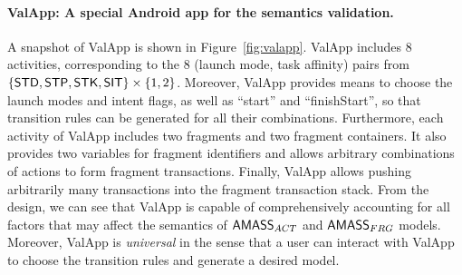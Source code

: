 \paragraph*{ValApp: A special Android app for the semantics validation.} A snapshot of ValApp is shown in Figure~\ref{fig:valapp}. ValApp includes 8 activities, corresponding to the $8$ (launch mode, task affinity) pairs from $\{{\sf STD}, {\sf STP}, {\sf STK}, {\sf SIT}\} \times \{1,2\}$. Moreover, ValApp provides means to choose the launch modes and intent flags, as well as ``start'' and ``finishStart'', so that transition rules can be generated for all their combinations. 
Furthermore, each activity of ValApp includes two fragments and two fragment containers. It also provides two variables for fragment identifiers and allows arbitrary combinations of actions to form fragment transactions. Finally, ValApp allows pushing arbitrarily many transactions into the fragment transaction stack. 
%
From the design, we can see that ValApp is capable of comprehensively accounting for all factors that may affect the semantics of $\textsf{AMASS}_{ACT}$ and $\textsf{AMASS}_{FRG}$ models. Moreover, ValApp is \emph{universal} in the sense that a user can interact with ValApp to choose the transition rules and generate a desired {\AMASS} model. 



